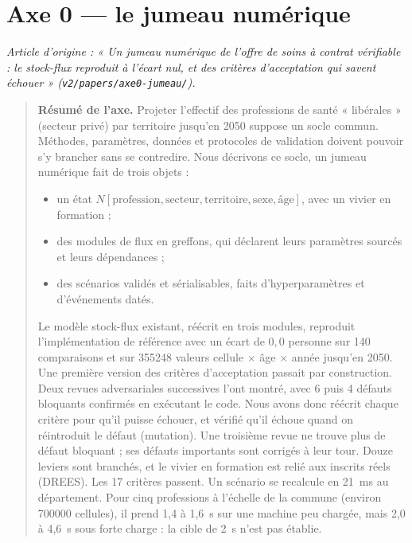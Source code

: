 \part{Axe 0 --- le jumeau numérique}
\noindent\textit{Article d'origine : « Un jumeau numérique de l'offre de soins à contrat vérifiable : le stock-flux reproduit à l'écart nul, et des critères d'acceptation qui savent échouer » (\texttt{v2/papers/axe0-jumeau/}).}

\begin{quote}\small\textbf{Résumé de l'axe.} Projeter l'effectif des professions de santé « libérales » (secteur privé) par territoire jusqu'en 2050
suppose un socle commun. Méthodes, paramètres, données et protocoles de validation doivent pouvoir s'y
brancher sans se contredire. Nous décrivons ce socle, un jumeau numérique fait de trois objets :
\begin{itemize}
  \item un état $N[\text{profession},\text{secteur},\text{territoire},\text{sexe},\text{âge}]$, avec un
        vivier en formation ;
  \item des modules de flux en greffons, qui déclarent leurs paramètres sourcés et leurs dépendances ;
  \item des scénarios validés et sérialisables, faits d'hyperparamètres et d'événements datés.
\end{itemize}
Le modèle stock-flux existant, réécrit en trois modules, reproduit l'implémentation de référence avec
un écart de $0{,}0$\mesure{} personne sur 140\mesure{} comparaisons et sur
\num{355248}\mesure{} valeurs cellule $\times$ âge $\times$ année jusqu'en 2050. Une première version
des critères d'acceptation passait par construction. Deux revues adversariales successives l'ont
montré, avec 6\mesure{} puis 4\mesure{} défauts bloquants confirmés en exécutant le code. Nous avons
donc réécrit chaque critère pour qu'il puisse échouer, et vérifié qu'il échoue quand on réintroduit
le défaut (mutation). Une troisième revue ne trouve plus de défaut bloquant ; ses défauts importants
sont corrigés à leur tour. Douze leviers sont branchés, et le vivier en formation est relié aux
inscrits réels (DREES). Les 17\mesure{} critères passent. Un scénario se recalcule en 21\mesure{}~ms au
département. Pour cinq professions à l'échelle de la commune (environ \num{700000} cellules), il
prend 1,4 à 1,6\mesure{}~s sur une machine peu chargée, mais 2,0 à 4,6\mesure{}~s sous forte charge :
la cible de 2\suppose{}~s n'est pas établie.\end{quote}

